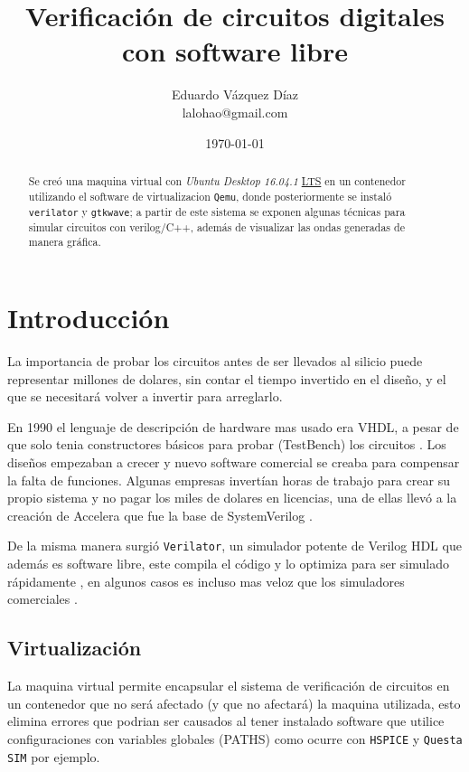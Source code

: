 \documentclass[11pt]{/home/hao/dev/org/latex-plantilla/IEEEtran}
\author{Eduardo Vázquez Díaz \\ lalohao@gmail.com}
\date{\today}
\title{Verificación de circuitos digitales con software libre}
\begin{document}
\maketitle
\tableofcontents

\begin{abstract}
Se creó una maquina virtual con \emph{Ubuntu Desktop 16.04.1} \uline{LTS} en un
contenedor utilizando el software de virtualizacion \texttt{Qemu}, donde
posteriormente se instaló \texttt{verilator} y \texttt{gtkwave}; a partir de este
sistema se exponen algunas técnicas para simular circuitos con
verilog/C++, además de visualizar las ondas generadas de manera
gráfica.
\end{abstract}

\section{Introducción}
\label{sec:org1bd0044}
La importancia de probar los circuitos antes de ser llevados al
silicio puede representar millones de dolares, sin contar el tiempo
invertido en el diseño, y el que se necesitará volver a invertir
para arreglarlo.

En 1990 el lenguaje de descripción de hardware mas usado era VHDL, a
pesar de que solo tenia constructores básicos para probar
(TestBench) los circuitos . Los diseños empezaban a crecer y nuevo
software comercial se creaba para compensar la falta de funciones.
Algunas empresas invertían horas de trabajo para crear su propio
sistema y no pagar los miles de dolares en licencias, una de ellas
llevó a la creación de Accelera que fue la base de SystemVerilog
\cite{spear08_system}.

De la misma manera surgió \texttt{Verilator}, un simulador potente de
Verilog HDL que además es software libre, este compila el código y
lo optimiza para ser simulado rápidamente \cite{verilator-intro}, en
algunos casos es incluso mas veloz que los simuladores comerciales
\cite{verilator-vs-comercial}.

\subsection{Virtualización}
\label{sec:orgf51d1a7}
La maquina virtual permite encapsular el sistema de verificación de
circuitos en un contenedor que no será afectado (y que no afectará)
la maquina utilizada, esto elimina errores que podrian ser causados
al tener instalado software que utilice configuraciones con
variables globales (PATHS) como ocurre con \texttt{HSPICE} y \texttt{Questa SIM}
por ejemplo.
\end{document}
